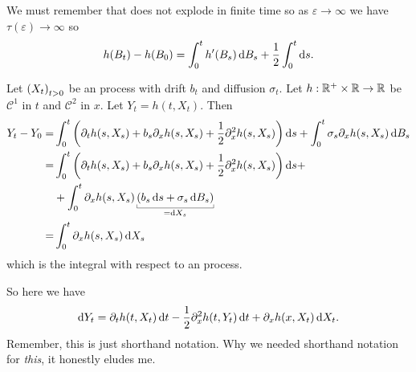 \documentclass[12pt]{report}
\begin{document}
We must remember that \bwm{} does not explode in finite time so as $\varepsilon\to\infty$ we have $\tau(\varepsilon)\to\infty$ so
\begin{equation*}
	h(B_{t})-h(B_{0})=\int_{0}^{t}h'(B_{s})\mathop{}\!\mathrm{d} B_{s}+\frac{1}{2}\int_{0}^{t}\mathop{}\!\mathrm{d} s.
\end{equation*}
\begin{theorem}
	Let ${\left({X}_{t}\right)}_{t>0}$ be an \ito{} process with drift $b_{t}$ and diffusion $\sigma_{t}$. Let $h:\mathbb{R}^{+}\times\mathbb{R}\to\mathbb{R}$ be $\mathcal{C}^{1}$ in $t$ and $\mathcal{C}^{2}$ in $x$. Let $Y_{t}=h(t,X_{t})$. Then
	\begin{align*}
		Y_{t}-Y_{0}=&\int_{0}^{t}\left(\partial_{t}h(s,X_{s})+b_{s}\partial_{x}h(s,X_{s})+\unmezz\partial^{2}_{x}h(s,X_{s})\right)\ds+\int_{0}^{t}\sigma_{s}\partial_{x}h(s,X_{s})\dbs\\
		=&\int_{0}^{t}\left(\partial_{t}h(s,X_{s})+b_{s}\partial_{x}h(s,X_{s})+\unmezz\partial^{2}_{x}h(s,X_{s})\right)\ds+\\&+\int_{0}^{t}\partial_{x}h(s,X_{s})\ubracketthin{\left(b_{s}\ds+\sigma_{s}\dbs\right)}_{=\dif X_{s}}\\
		=&\int_{0}^{t}\partial_{x}h(s,X_{s})\dif X_{s}
	\end{align*}
	which is the integral with respect to an \ito{} process.
\end{theorem}
So here we have
\begin{equation*}
	\mathop{}\!\mathrm{d} Y_{t}=\partial_{t}h(t,X_{t})\mathop{}\!\mathrm{d} t-\frac{1}{2}\partial^{2}_{x}h(t,Y_{t})\mathop{}\!\mathrm{d} t+\partial_{x}h(x,X_{t})\mathop{}\!\mathrm{d} X_{t}.
\end{equation*}
Remember, this is just shorthand notation. Why we needed shorthand notation for \textit{this}, it honestly eludes me.
\end{document}
